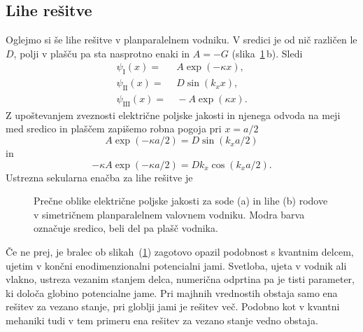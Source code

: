 \subsection*{Lihe rešitve}
Oglejmo si še lihe rešitve v planparalelnem vodniku. V sredici je od nič različen
le $D$, polji v plašču pa sta nasprotno enaki in $A = -G$ (slika~\ref{fig:TESodi}\,b). Sledi
\begin{align}
\psi_{\mathrm{I}}(x) =&~ A \exp(-\kappa x),\\
\psi_{\mathrm{II}}(x) =&~ D \sin(k_x x),\\
\psi_{\mathrm{III}}(x) =&~ -A \exp(\kappa x).
\end{align}
Z upoštevanjem zveznosti električne poljske jakosti in njenega odvoda na 
meji med sredico in plaščem zapišemo robna pogoja pri $x=a/2$
\begin{equation}
A \exp(-\kappa a/2) = D \sin(k_x a/2)
\end{equation}
in 
\begin{equation}
-\kappa A \exp(-\kappa a/2) = D k_x \cos(k_x a/2).
\end{equation}
Ustrezna sekularna enačba za lihe rešitve je
\begin{figure}[h]
\centering
\def\svgwidth{130truemm} 
 
\caption{Prečne oblike električne poljske jakosti za sode (a) in lihe (b) rodove v 
simetričnem planparalelnem valovnem vodniku. Modra barva označuje sredico, beli del 
pa plašč vodnika. 
}
\label{fig:TESodi}
\end{figure}

\begin{remark}
Če ne prej, je bralec ob slikah~(\ref{fig:TESodi}) zagotovo opazil podobnost s kvantnim 
delcem, ujetim v končni enodimenzionalni potencialni jami. Svetloba, ujeta v vodnik ali
vlakno, ustreza vezanim stanjem delca, numerična odprtina pa je tisti parameter, 
ki določa globino potencialne jame. Pri majhnih vrednostih obstaja samo ena rešitev 
za vezano stanje, pri globlji jami je rešitev več. Podobno kot v kvantni mehaniki
tudi v tem primeru ena rešitev za vezano stanje vedno obstaja. 
\end{remark}

